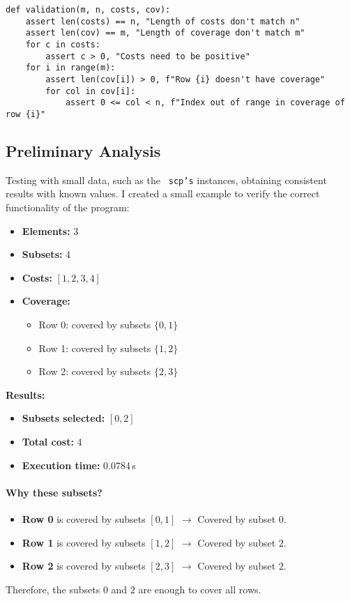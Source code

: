 \documentclass[12pt]{article}
\begin{document}
\begin{verbatim}
def validation(m, n, costs, cov):
    assert len(costs) == n, "Length of costs don't match n"
    assert len(cov) == m, "Length of coverage don't match m"
    for c in costs:
        assert c > 0, "Costs need to be positive"
    for i in range(m):
        assert len(cov[i]) > 0, f"Row {i} doesn't have coverage"
        for col in cov[i]:
            assert 0 <= col < n, f"Index out of range in coverage of row {i}"
\end{verbatim}

\subsection{Preliminary Analysis}

Testing with small data, such as the \texttt{ scp's} instances, obtaining consistent results with known values. I created a small example to verify the correct functionality of the program:

\begin{itemize}
    \item \textbf{Elements:} 3  
    \item \textbf{Subsets:} 4  
    \item \textbf{Costs:} $[1, 2, 3, 4]$  
    \item \textbf{Coverage:}  
    \begin{itemize}
        \item Row 0: covered by subsets $\{0, 1\}$  
        \item Row 1: covered by subsets $\{1, 2\}$  
        \item Row 2: covered by subsets $\{2, 3\}$  
    \end{itemize}
\end{itemize}

\noindent
\textbf{Results:}  
\begin{itemize}
    \item \textbf{Subsets selected:} $[0, 2]$  
    \item \textbf{Total cost:} 4  
    \item \textbf{Execution time:} 0.0784\,s  
\end{itemize}

\paragraph*{Why these subsets?}  
\begin{itemize}
    \item \textbf{Row 0} is covered by subsets \([0, 1]\) \(\rightarrow\) Covered by subset \(0\).
    \item \textbf{Row 1} is covered by subsets \([1, 2]\) \(\rightarrow\) Covered by subset \(2\).
    \item \textbf{Row 2} is covered by subsets \([2, 3]\) \(\rightarrow\) Covered by subset \(2\).
\end{itemize}
Therefore, the subsets \(0\) and \(2\) are enough to cover all rows.
\end{document}

